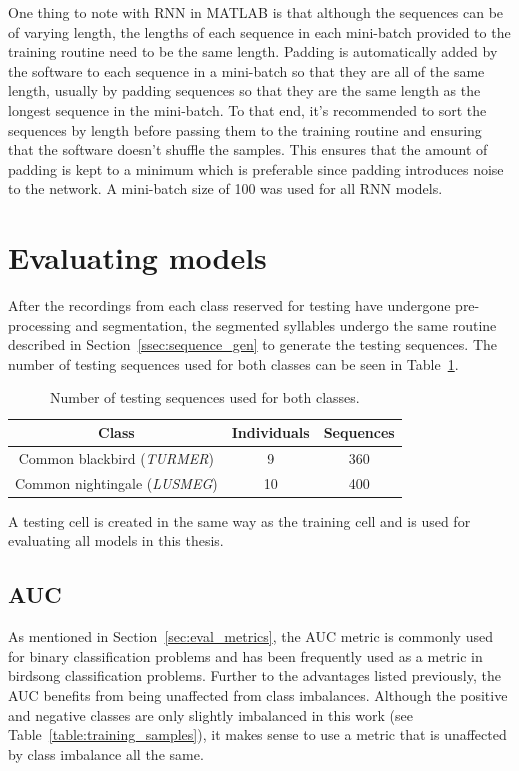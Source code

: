 One thing to note with RNN in MATLAB is that although the sequences can
be of varying length, the lengths of each sequence in each mini-batch provided
to the training routine need to be the same length. Padding is automatically
added by the software to each sequence in a mini-batch so that they are all of
the same length, usually by padding sequences so that they are the same length
as the longest sequence in the mini-batch. To that end, it's recommended to sort
the sequences by length before passing them to the training routine and ensuring
that the software doesn't shuffle the samples. This ensures that the amount of
padding is kept to a minimum which is preferable since padding introduces noise
to the network. A mini-batch size of 100 was used for all RNN models.

\section{Evaluating models}

After the recordings from each class reserved for testing have undergone
pre-processing and segmentation, the segmented syllables undergo the same
routine described in Section~\ref{ssec:sequence_gen} to generate the testing
sequences. The number of testing sequences used for both classes can be seen in
Table~\ref{table:testing_samples}.

\begin{table}[ht]
\begin{center}
\begin{tabular}{c c c}
\toprule
Class & Individuals & Sequences \\ [0.5ex]
\midrule
Common blackbird (\textit{TURMER}) & 9 & 360 \\
Common nightingale (\textit{LUSMEG}) & 10 & 400 \\
\bottomrule
\end{tabular}
\caption{Number of testing sequences used for both
classes.}\label{table:testing_samples}
\end{center}
\end{table}

A testing cell is created in the same way as the training cell and is used for
evaluating all models in this thesis.

\subsection{AUC}

As mentioned in Section~\ref{sec:eval_metrics}, the AUC metric is commonly used
for binary classification problems and has been frequently used as a metric in
birdsong classification problems. Further to the advantages listed previously,
the AUC benefits from being unaffected from class imbalances. Although the
positive and negative classes are only slightly imbalanced in this work (see
Table~\ref{table:training_samples}), it makes sense to use a metric that is
unaffected by class imbalance all the same.

